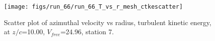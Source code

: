 \begin{figure}[H]
\centering
\texttt{[image: figs/run\_66/run\_66\_T\_vs\_r\_mesh\_ctkescatter]}
\caption{Scatter plot of azimuthal velocity vs radius, turbulent kinetic energy, at $z/c$=10.00, $V_{free}$=24.96, station 7.}
\label{fig:run_66_T_vs_r_mesh_ctkescatter}
\end{figure}


